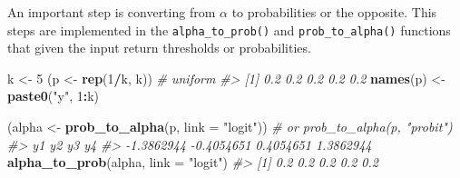\documentclass[
  man, mask,floatsintext]{apa6}
\newenvironment{Shaded}{\begin{snugshade}}{\end{snugshade}}
\newcommand{\AttributeTok}[1]{\textcolor[rgb]{0.13,0.29,0.53}{#1}}
\newcommand{\CommentTok}[1]{\textcolor[rgb]{0.56,0.35,0.01}{\textit{#1}}}
\newcommand{\DecValTok}[1]{\textcolor[rgb]{0.00,0.00,0.81}{#1}}
\newcommand{\FunctionTok}[1]{\textcolor[rgb]{0.13,0.29,0.53}{\textbf{#1}}}
\newcommand{\NormalTok}[1]{#1}
\newcommand{\OtherTok}[1]{\textcolor[rgb]{0.56,0.35,0.01}{#1}}
\newcommand{\SpecialCharTok}[1]{\textcolor[rgb]{0.81,0.36,0.00}{\textbf{#1}}}
\newcommand{\StringTok}[1]{\textcolor[rgb]{0.31,0.60,0.02}{#1}}
\begin{document}
An important step is converting from \(\alpha\) to probabilities or the opposite. This steps are implemented in the \texttt{alpha\_to\_prob()} and \texttt{prob\_to\_alpha()} functions that given the input return thresholds or probabilities.

\scriptsize

\begin{Shaded}
\begin{Highlighting}[]
\NormalTok{k }\OtherTok{\textless{}{-}} \DecValTok{5}
\NormalTok{(p }\OtherTok{\textless{}{-}} \FunctionTok{rep}\NormalTok{(}\DecValTok{1}\SpecialCharTok{/}\NormalTok{k, k)) }\CommentTok{\# uniform}
\CommentTok{\#\textgreater{} [1] 0.2 0.2 0.2 0.2 0.2}
\FunctionTok{names}\NormalTok{(p) }\OtherTok{\textless{}{-}} \FunctionTok{paste0}\NormalTok{(}\StringTok{"y"}\NormalTok{, }\DecValTok{1}\SpecialCharTok{:}\NormalTok{k)}

\NormalTok{(alpha }\OtherTok{\textless{}{-}} \FunctionTok{prob\_to\_alpha}\NormalTok{(p, }\AttributeTok{link =} \StringTok{"logit"}\NormalTok{)) }\CommentTok{\# or prob\_to\_alpha(p, "probit")}
\CommentTok{\#\textgreater{}         y1         y2         y3         y4 }
\CommentTok{\#\textgreater{} {-}1.3862944 {-}0.4054651  0.4054651  1.3862944}
\FunctionTok{alpha\_to\_prob}\NormalTok{(alpha, }\AttributeTok{link =} \StringTok{"logit"}\NormalTok{)}
\CommentTok{\#\textgreater{} [1] 0.2 0.2 0.2 0.2 0.2}
\end{Highlighting}
\end{Shaded}

\normalsize

\scriptsize
\end{document}
